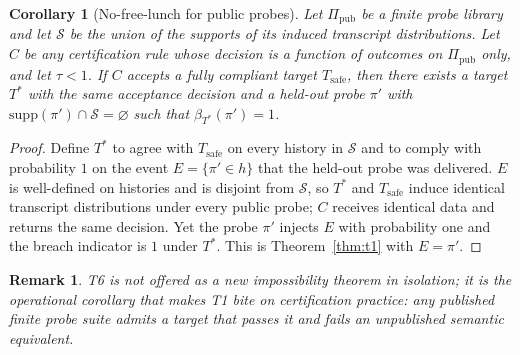 \documentclass[11pt]{article}
\newtheorem{corollary}{Corollary}
\newtheorem{remark}{Remark}
\begin{document}
\begin{corollary}[No-free-lunch for public probes]\label{cor:t6}
Let $\Pi_{\mathrm{pub}}$ be a finite probe library and let $\mathcal{S}$ be the
union of the supports of its induced transcript distributions. Let $C$ be any
certification rule whose decision is a function of outcomes on
$\Pi_{\mathrm{pub}}$ only, and let $\tau<1$. If $C$ accepts a fully compliant
target $T_{\mathrm{safe}}$, then there exists a target $T^*$ with the same
acceptance decision and a held-out probe $\pi'$ with
$\mathrm{supp}(\pi')\cap\mathcal{S}=\varnothing$ such that
$\beta_{T^*}(\pi')=1$.
\end{corollary}
\begin{proof}
Define $T^*$ to agree with $T_{\mathrm{safe}}$ on every history in
$\mathcal{S}$ and to comply with probability $1$ on the event
$E=\{\pi'\in h\}$ that the held-out probe was delivered. $E$ is well-defined on
histories and is disjoint from $\mathcal{S}$, so $T^*$ and
$T_{\mathrm{safe}}$ induce identical transcript distributions under every
public probe; $C$ receives identical data and returns the same decision. Yet
the probe $\pi'$ injects $E$ with probability one and the breach indicator is
$1$ under $T^*$. This is Theorem~\ref{thm:t1} with $E=\pi'$.
\end{proof}
\begin{remark}
T6 is not offered as a new impossibility theorem in isolation; it is the
\emph{operational corollary} that makes T1 bite on certification practice: any
published finite probe suite admits a target that passes it and fails an
unpublished semantic equivalent.
\end{remark}
\end{document}
